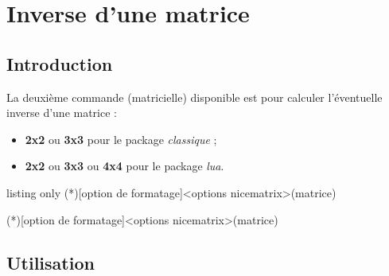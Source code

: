 \documentclass[a4paper,11pt]{article}
\begin{document}
\section{Inverse d'une matrice}

\subsection{Introduction}

\begin{cautionblock}
La deuxième commande (matricielle) disponible est pour calculer l'éventuelle inverse d'une matrice :

\begin{itemize}
	\item \textbf{2x2} ou \textbf{3x3} pour le package \textit{classique} ;
	\item \textbf{2x2} ou \textbf{3x3} ou \textbf{4x4} pour le package \textit{lua}.
\end{itemize}
\vspace*{-\baselineskip}\leavevmode
\end{cautionblock}

\begin{PresentationCode}{listing only}
\MatriceInverse(*)[option de formatage]<options nicematrix>(matrice)

\MatriceInversePY(*)[option de formatage]<options nicematrix>(matrice)
\end{PresentationCode}

\subsection{Utilisation}
\end{document}
